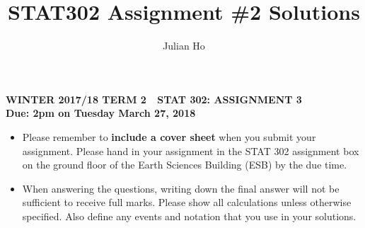 \documentclass[11pt]{article}
\title{STAT302 Assignment \#2 Solutions}
\author{Julian Ho}
\begin{document}
\begin{center}
\textbf{WINTER 2017/18 TERM 2  \,\, STAT 302: ASSIGNMENT 3 \\
Due: 2pm on Tuesday March 27, 2018}
\end{center}

\vspace*{2mm}
\begin{itemize}
  \item
  Please remember to \textbf{include a cover sheet} when you submit your assignment. Please hand in your assignment in the STAT 302 assignment box on the ground floor of the Earth Sciences Building (ESB) by the due time.
  \item
  When answering the questions, writing down the final answer will not
  be sufficient to receive full marks. Please show all calculations
  unless otherwise specified.
  Also define any events and notation that you use in your solutions.
\end{itemize}
\end{document}
